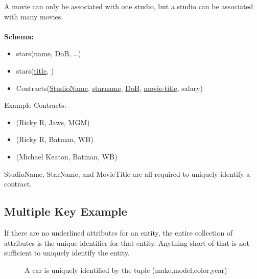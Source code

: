 \documentclass{article}
\begin{document}
A movie can only be associated with one studio, but a studio can be associated
with many movies.\\\\
\textbf{Schema:}
\begin{itemize}
    \item{stars(\underline{name}, \underline{DoB}, \ldots)}
    \item{stars(\underline{title}, )}
    \item{Contracts(\underline{StudioName}, \underline{starname},
        \underline{DoB}, \underline{movie-title}, salary)}
\end{itemize}
%
Example Contracts:\\
\begin{itemize}
    \item{(Ricky R, Jaws, MGM)}
    \item{(Ricky R, Batman, WB)}
    \item{(Michael Keaton, Batman, WB)}
\end{itemize}
StudioName, StarName, and MovieTitle are all required to uniquely identify a
contract.
\pagebreak

\subsection{Multiple Key Example}
If there are no underlined attributes for an entity, the entire collection of
attributes is the unique identifier for that entity. Anything short of that is
not sufficient to uniquely identify the entity.

\begin{figure}[H]
  \centering
  \caption{A car is uniquely identified by the tuple (make,model,color,year)}
\end{figure}
\end{document}
